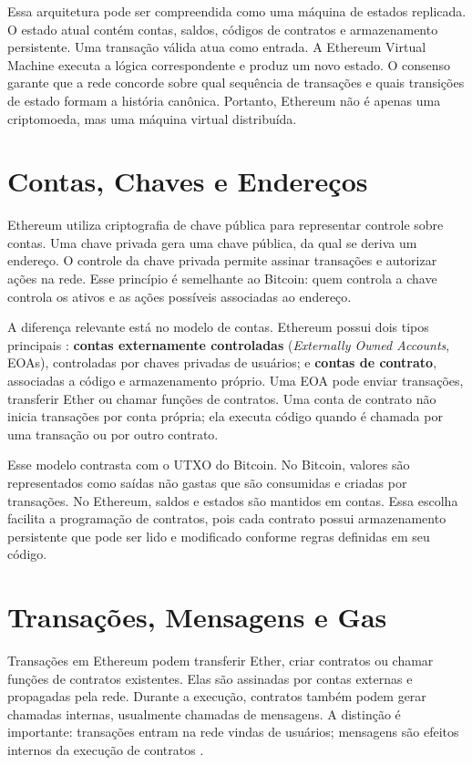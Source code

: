 \documentclass[12pt,a4paper]{report}
\begin{document}
Essa arquitetura pode ser compreendida como uma máquina de estados replicada. O estado atual contém contas, saldos, códigos de contratos e armazenamento persistente. Uma transação válida atua como entrada. A Ethereum Virtual Machine executa a lógica correspondente e produz um novo estado. O consenso garante que a rede concorde sobre qual sequência de transações e quais transições de estado formam a história canônica. Portanto, Ethereum não é apenas uma criptomoeda, mas uma máquina virtual distribuída.

\section{Contas, Chaves e Endereços}

Ethereum utiliza criptografia de chave pública para representar controle sobre contas. Uma chave privada gera uma chave pública, da qual se deriva um endereço. O controle da chave privada permite assinar transações e autorizar ações na rede. Esse princípio é semelhante ao Bitcoin: quem controla a chave controla os ativos e as ações possíveis associadas ao endereço.

A diferença relevante está no modelo de contas. Ethereum possui dois tipos principais \cite{Bashir2023}: \textbf{contas externamente controladas} (\textit{Externally Owned Accounts}, EOAs), controladas por chaves privadas de usuários; e \textbf{contas de contrato}, associadas a código e armazenamento próprio. Uma EOA pode enviar transações, transferir Ether ou chamar funções de contratos. Uma conta de contrato não inicia transações por conta própria; ela executa código quando é chamada por uma transação ou por outro contrato.

Esse modelo contrasta com o UTXO do Bitcoin. No Bitcoin, valores são representados como saídas não gastas que são consumidas e criadas por transações. No Ethereum, saldos e estados são mantidos em contas. Essa escolha facilita a programação de contratos, pois cada contrato possui armazenamento persistente que pode ser lido e modificado conforme regras definidas em seu código.

\section{Transações, Mensagens e Gas}

Transações em Ethereum podem transferir Ether, criar contratos ou chamar funções de contratos existentes. Elas são assinadas por contas externas e propagadas pela rede. Durante a execução, contratos também podem gerar chamadas internas, usualmente chamadas de mensagens. A distinção é importante: transações entram na rede vindas de usuários; mensagens são efeitos internos da execução de contratos \cite{Bashir2023}.
\end{document}
